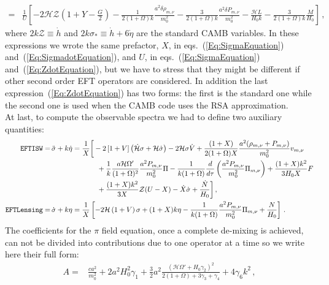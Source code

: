 \documentclass[prd,nofootinbib,showpacs]{revtex4}
\def\l{\left}
\def\r{\right}
\def\f{\frac}
\def\hub{{\mathcal H}}
\begin{document}
{\begin{align}
 =& \f{1}{U}\l[-2\hub\mathcal{Z}\l(1+Y-\f{G}{2}\r) -\f{1}{2(1+\Omega)k}\f{a^2\delta\rho_{m,\nu}}{m_0^2} -\f{3}{2(1+\Omega)k}\f{a^2\delta P_{m,\nu}}{m_0^2} -\f{\hub L}{H_0 k} -\f{3}{2(1+\Omega)k}\f{M}{H_0} \r] \label{Eq:ZdotEquation}\,,
\end{align}
%
where $2k\mathcal{Z}\equiv \dot{h}$ and $2k\sigma_*\equiv\dot{h}+6\dot{\eta}$ are the standard CAMB variables. 
In these expressions we wrote the same prefactor, $X$, in eqs.~(\ref{Eq:SigmaEquation}) and~(\ref{Eq:SigmadotEquation}), and $U$, in eqs.~(\ref{Eq:SigmaEquation}) and~(\ref{Eq:ZdotEquation}), but we have to stress that they might be different if other second order EFT operators are considered.
In addition the last expression~(\ref{Eq:ZdotEquation}) has two forms: the first is the standard one while the second one is used when the CAMB code uses the RSA approximation.\\
At last, to compute the observable spectra we had to define two auxiliary quantities:
%
\begin{align}
\texttt{EFTISW} =& \,\ddot{\sigma} + k\dot{\eta} = \f{1}{X}\bigg[ -2\l[1+V \r]\l(\dot{\mathcal{H}}\sigma +\hub \dot{\sigma} \r) -2\hub \sigma \dot{V} +\f{\l(1+X \r)}{2(1+\Omega)X}\frac{a^2(\rho_{m,\nu}+P_{m,\nu})}{m_0^2}v_{m,\nu}  \nonumber\\
	& \hspace{2.3cm} +\frac{1}{k}\frac{a \mathcal{H} \Omega^\prime}{(1+\Omega)^2}\frac{a^2P_{m,\nu}}{m_0^2}\Pi -\frac{1}{k(1+\Omega)}\frac{d}{d\tau}\left(\frac{a^2P_{m,\nu}}{m_0^2}\Pi_{m,\nu} \right) +\f{(1+X)k^2}{3 H_0 X}F  \nonumber \\
	& \hspace{2.3cm} +\f{(1+X)k^2}{3 X}\mathcal{Z}(U-X) -\dot{X}\dot{\sigma} +\f{\dot{N}}{H_0} \bigg] \label{Eq:TTSource}\,,\\
%
\texttt{EFTLensing} =& \,\dot{\sigma} + k\eta = \f{1}{X}\l[ -2\mathcal{H}\l(1 + V\r)\sigma +(1+ X) k \eta -\frac{1}{k (1+ \Omega)}\frac{a^2 P_{m,\nu}}{m_0^2} \Pi_{m,\nu} +\f{N}{H_0} \r] \label{Eq:LensingSource}\,.
\end{align}
%
The coefficients for the $\pi$ field equation, once a complete de-mixing is achieved, can not be divided into contributions due to one operator at a time so we write here their full form:
%
\begin{align}
%
A =& \f{c a^2}{m_0^2}+2 a^2 H_0^2 \gamma_1 +\f{3}{2}a^2 \f{\l(\hub \Omega' + H_0\gamma_2 \r)^2}{2(1+\Omega) + 3\gamma_3 +\gamma_4} + 4 \gamma_6 k^2 \,, \\
%
& \nonumber \\

\end{align}}
\end{document}
